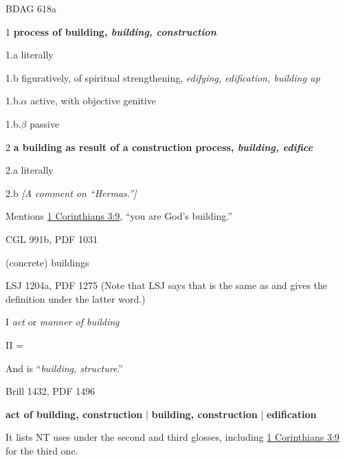 				\begin{compactdesc}
					\item[BDAG 618a] \textbf{}
						\begin{compactitem}
							\item[1] \textbf{process of building, \textit{building, construction}}
							\item[1.a] literally
							\item[1.b] figuratively, of spiritual strengthening, \textit{edifying, edification, building up}
							\item[1.b.$\alpha$] active, with objective genitive
							\item[1.b.$\beta$] passive
							\item[2] \textbf{a building as result of a construction process, \textit{building, edifice}}
							\item[2.a] literally
							\item[2.b] \textit{[A comment on ``Hermas.'']}
								\begin{compactitem}
									\item Mentions \hyperref[1CORINTHIANS-3-9]{1 Corinthians 3:9}, ``you are God's building.''
								\end{compactitem}
						\end{compactitem}
					\item[CGL 991b, PDF 1031] \textbf{}
						\begin{compactitem}
							\item (concrete) buildings
						\end{compactitem}
					\item[LSJ 1204a, PDF 1275] (Note that LSJ says that  is the same as  and gives the definition under the latter word.)
						\begin{compactitem}
							\item[I] \textit{act} or \textit{manner of building}
							\item[II] = \gr{οἰκοδόμημα}
								\begin{compactitem}
									\item And  is ``\textit{building, structure}.''
								\end{compactitem}
						\end{compactitem}
					\item[Brill 1432, PDF 1496] \textbf{}
						\begin{compactitem}
							\item \textbf{act of building, construction} | \textbf{building, construction} | \textbf{edification}
								\begin{compactitem}
									\item It lists NT uses under the second and third glosses, including \hyperref[1CORINTHIANS-3-9]{1 Corinthians 3:9} for the third one.
								\end{compactitem}
						\end{compactitem}
				\end{compactdesc}
				

